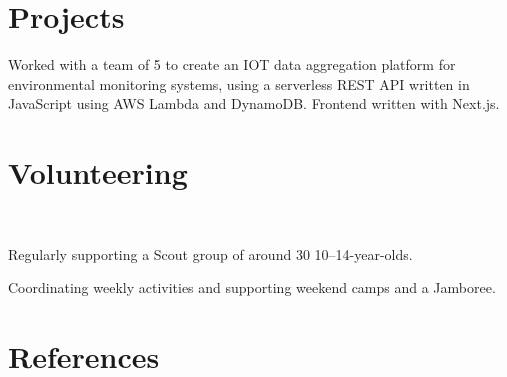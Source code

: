 \documentclass[]{hieudo-build}
\begin{document}
\begin{minipage}[t]{0.62\textwidth}
	\section{Projects}

	\begin{tightemize}
		\item Worked with a team of 5 to create an IOT data aggregation platform for environmental monitoring systems, using a serverless REST API written in JavaScript using AWS Lambda and DynamoDB. Frontend written with Next.js.
	\end{tightemize}
	\sectionsep


    \section{Volunteering}
    
     \\
    \begin{tightemize}
    	\item Regularly supporting a Scout group of around 30 10–14-year-olds.
    	\item Coordinating weekly activities and supporting weekend camps and a Jamboree.
    \end{tightemize}
    \sectionsep

\end{minipage}

\newpage


\section{References}
\end{document}
